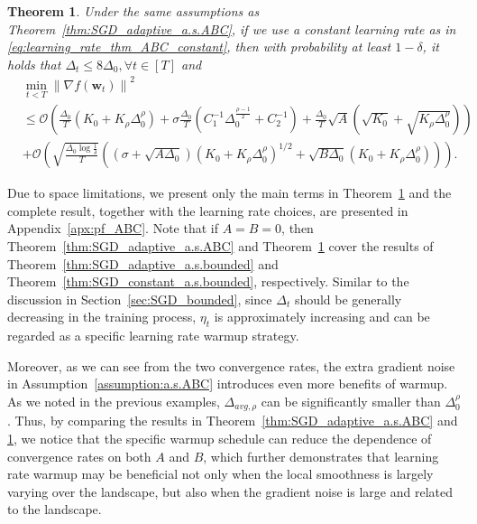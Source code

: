 \documentclass{article}
\newtheorem{theorem}{Theorem}
\newcommand{\Norm}[1]{\left\|#1\right\|}
\newcommand{\bw}{\mathbf{w}}
\begin{document}
\begin{theorem}\label{thm:SGD_constant_a.s.ABC}
    Under the same assumptions as Theorem~\ref{thm:SGD_adaptive_a.s.ABC}, if we use a constant learning rate as in \eqref{eq:learning_rate_thm_ABC_constant}, 
    then with probability at least $1-\delta$, it holds that $\Delta_t\leq 8\Delta_0,\forall t\in[T]$ and
    $$
    \begin{aligned}
    &\min_{t<T} \Norm{\nabla f(\bw_t)}^2 \\
    &\leq \mathcal{O}\left(\frac{\Delta_0}{T}\left(K_0+K_\rho \Delta_0^\rho\right)+\sigma \frac{\Delta_0}{T}\left(C_1^{-1} \Delta_0^{\frac{\rho-1}{2}}+C_2^{-1}\right)+\frac{\Delta_0}{T} \sqrt{A}\left(\sqrt{K_0}+\sqrt{K_\rho \Delta_0^\rho}\right)\right) \\
    & +\mathcal{O}\left(\sqrt{\frac{\Delta_0 \log \frac{1}{\delta}}{T}}\left(\left(\sigma+\sqrt{A \Delta_0}\right)\left(K_0+K_\rho \Delta_0^\rho\right)^{1 / 2}+\sqrt{B \Delta_0}\left(K_0+K_\rho \Delta_0^\rho\right)\right)\right).
    \end{aligned}
    $$
    
\end{theorem}

Due to space limitations, we present only the main terms in Theorem~\ref{thm:SGD_constant_a.s.ABC} and the complete result, together with the learning rate choices, are presented in Appendix~\ref{apx:pf_ABC}.
Note that if $A = B = 0$, then Theorem~\ref{thm:SGD_adaptive_a.s.ABC} and Theorem~\ref{thm:SGD_constant_a.s.ABC} cover the results of Theorem~\ref{thm:SGD_adaptive_a.s.bounded} and Theorem~\ref{thm:SGD_constant_a.s.bounded}, respectively. Similar to the discussion in Section~\ref{sec:SGD_bounded}, since $\Delta_t$ should be generally decreasing in the training process, $\eta_t$ is approximately increasing and can be regarded as a specific learning rate warmup strategy.

Moreover, as we can see from the two convergence rates, the extra gradient noise in Assumption~\ref{assumption:a.s.ABC} introduces even more benefits of warmup. As we noted in the previous examples, $\Delta_{avg,\rho}$ can be significantly smaller than $\Delta_0^\rho$. Thus, by comparing the results in Theorem~\ref{thm:SGD_adaptive_a.s.ABC} and \ref{thm:SGD_constant_a.s.ABC}, we notice that the specific warmup schedule can reduce the dependence of convergence rates on both $A$ and $B$, which further demonstrates that learning rate warmup may be beneficial not only when the local smoothness is largely varying over the landscape, but also when the gradient noise is large and related to the landscape. 
\end{document}
